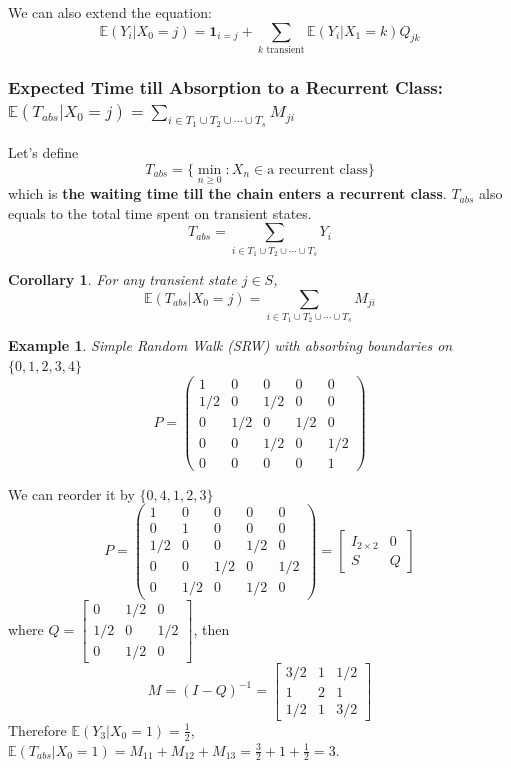 \documentclass[11pt,a4paper]{article}
\newtheorem{example}{Example}
\newtheorem{corollary}{Corollary}
\begin{document}
We can also extend the equation: $$\mathbb{E}(Y_i|X_0 = j)=\mathbf{1}_{i=j}+\sum_{k\text{ transient}}\mathbb{E}(Y_i|X_1=k)Q_{jk}$$

\subsubsection{Expected Time till Absorption to a Recurrent Class: $\mathbb{E}(T_{abs}|X_0=j)=\sum_{i\in T_1\cup T_2\cup\cdots\cup T_s} M_{ji}$}
Let's define $$T_{abs}=\{\min_{n\geq 0}: X_n\in \text{a recurrent class}\}$$
which is \textbf{the waiting time till the chain enters a recurrent class}.
$T_{abs}$ also equals to the total time spent on transient states. $$T_{abs}=\sum_{i\in T_1\cup T_2\cup\cdots\cup T_s}Y_i$$
\begin{corollary}
    For any transient state $j\in S$, $$\mathbb{E}(T_{abs}|X_0=j)=\sum_{i\in T_1\cup T_2\cup\cdots\cup T_s} M_{ji}$$
\end{corollary}
\begin{example}
    Simple Random Walk (SRW) with absorbing boundaries on $\{0,1,2,3,4\}$
    $$P=\left(\begin{array}{ccccc}
    1 & 0 & 0 & 0 & 0 \\
    1 / 2 & 0 & 1 / 2 & 0 & 0 \\
    0 & 1 / 2 & 0 & 1 / 2 & 0 \\
    0 & 0 & 1 / 2 & 0 & 1 / 2 \\
    0 & 0 & 0 & 0 & 1
    \end{array}\right)$$
\end{example}
We can reorder it by $\{0,4,1,2,3\}$
$$P=\left(\begin{array}{ccccc}
    1 & 0 & 0 & 0 & 0 \\
    0 & 1 & 0 & 0 & 0 \\
    1 / 2 & 0 & 0 & 1 / 2 & 0 \\
    0 & 0 & 1 / 2 & 0 & 1 / 2 \\
    0 & 1 / 2 & 0& 1 / 2 & 0
    \end{array}\right)=\begin{bmatrix}
        I_{2\times 2}&	0\\
        S	& Q
    \end{bmatrix}$$
where $Q=\begin{bmatrix}
    0 & 1 / 2 & 0 \\
    1 / 2 & 0 & 1 / 2 \\
    0& 1 / 2 & 0
\end{bmatrix}$, then $$M=(I-Q)^{-1}=\begin{bmatrix}
    3/2 & 1 & 1/2 \\
    1 & 2 & 1 \\
    1/2& 1 & 3/2
\end{bmatrix}$$
Therefore $\mathbb{E}(Y_3|X_0=1)=\frac{1}{2}$, $\mathbb{E}(T_{abs}|X_0=1)=M_{11}+M_{12}+M_{13}=\frac{3}{2}+1+\frac{1}{2}=3$.
\end{document}
